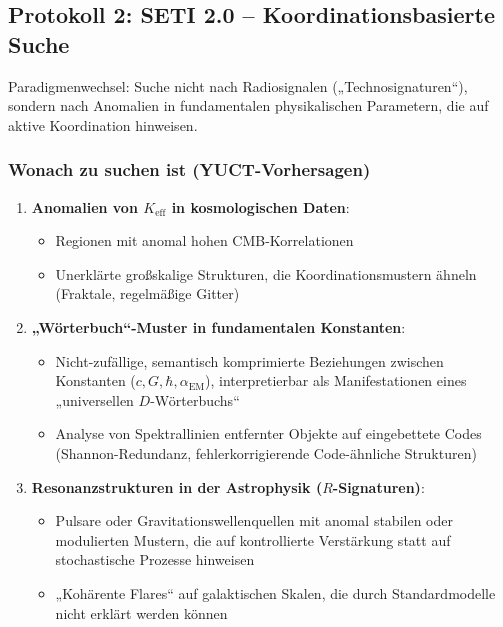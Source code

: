 \documentclass[12pt,a4paper]{article}
\newcommand{\eff}{\mathrm{eff}}
\newcommand{\Ke}{K_{\eff}}
\begin{document}
	\subsection{Protokoll 2: SETI 2.0 -- Koordinationsbasierte Suche}
	
	Paradigmenwechsel: Suche nicht nach Radiosignalen („Technosignaturen``), sondern nach Anomalien in fundamentalen physikalischen Parametern, die auf aktive Koordination hinweisen.
	
	\subsubsection{Wonach zu suchen ist (YUCT-Vorhersagen)}
	
	\begin{enumerate}
		\item \textbf{Anomalien von \(\Ke\) in kosmologischen Daten}:
		\begin{itemize}
			\item Regionen mit anomal hohen CMB-Korrelationen
			\item Unerklärte großskalige Strukturen, die Koordinationsmustern ähneln (Fraktale, regelmäßige Gitter)
		\end{itemize}
		
		\item \textbf{„Wörterbuch``-Muster in fundamentalen Konstanten}:
		\begin{itemize}
			\item Nicht-zufällige, semantisch komprimierte Beziehungen zwischen Konstanten (\(c, G, \hbar, \alpha_{\mathrm{EM}}\)), interpretierbar als Manifestationen eines „universellen \(D\)-Wörterbuchs``
			\item Analyse von Spektrallinien entfernter Objekte auf eingebettete Codes (Shannon-Redundanz, fehlerkorrigierende Code-ähnliche Strukturen)
		\end{itemize}
		
		\item \textbf{Resonanzstrukturen in der Astrophysik (\(R\)-Signaturen)}:
		\begin{itemize}
			\item Pulsare oder Gravitationswellenquellen mit anomal stabilen oder modulierten Mustern, die auf kontrollierte Verstärkung statt auf stochastische Prozesse hinweisen
			\item „Kohärente Flares`` auf galaktischen Skalen, die durch Standardmodelle nicht erklärt werden können
		\end{itemize}
	\end{enumerate}
	
\end{document}
